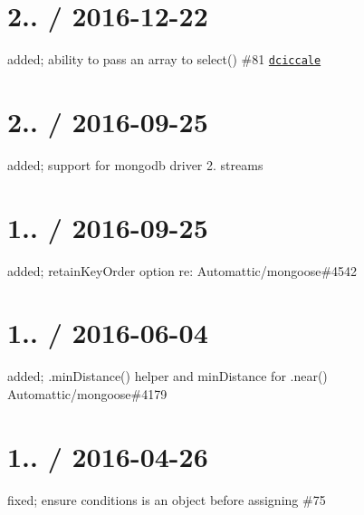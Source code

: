 \section*{2.. / 2016-\/12-\/22 }


\begin{DoxyItemize}
\item added; ability to pass an array to select() \#81 \href{https://github.com/dciccale}{\tt dciccale}
\end{DoxyItemize}

\section*{2.. / 2016-\/09-\/25 }


\begin{DoxyItemize}
\item added; support for mongodb driver 2. streams
\end{DoxyItemize}

\section*{1.. / 2016-\/09-\/25 }


\begin{DoxyItemize}
\item added; {\ttfamily retain\+Key\+Order} option re\+: Automattic/mongoose\#4542
\end{DoxyItemize}

\section*{1.. / 2016-\/06-\/04 }


\begin{DoxyItemize}
\item added; {\ttfamily .min\+Distance()} helper and min\+Distance for {\ttfamily .near()} Automattic/mongoose\#4179
\end{DoxyItemize}

\section*{1.. / 2016-\/04-\/26 }


\begin{DoxyItemize}
\item fixed; ensure conditions is an object before assigning \#75
\end{DoxyItemize}

